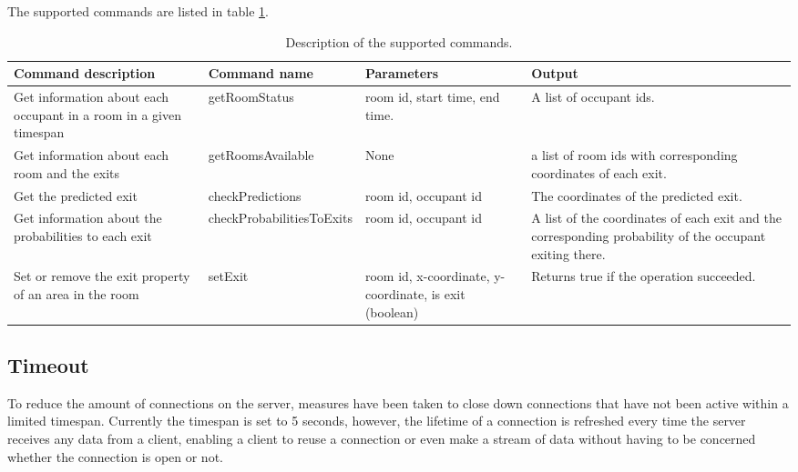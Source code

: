 The supported commands are listed in table \ref{tab:command}.
\begin{center}
\begin{table}
    \begin{tabular}{ | p{4.5cm} | p{4.7cm} | p{3cm} | p{3.5cm} |} \hline
    Command description & Command name & Parameters & Output \\ \hline
    Get information about each occupant in a room in a given timespan & getRoomStatus & room id, start time, end time. & A list of occupant ids. \\ \hline
    Get information about each room and the exits & getRoomsAvailable & None & a list of room ids with corresponding coordinates of each exit. \\ \hline
	Get the predicted exit & checkPredictions & room id, occupant id & The coordinates of the predicted exit. \\ \hline
	Get information about the probabilities to each exit & checkProbabilitiesToExits & room id, occupant id & A list of the coordinates of each exit and the corresponding probability of the occupant exiting there. \\ \hline
    Set  or remove the exit property of an area in the room & setExit & room id, x-coordinate, y-coordinate, is exit (boolean) & Returns true if the operation succeeded. \\ 
	\hline \end{tabular}
	\caption{Description of the supported commands.}
	\label{tab:command}
\end{table}
\end{center}

\subsection{Timeout}
To reduce the amount of connections on the server, measures have been taken to close down connections that have not been active within a limited timespan. Currently the timespan is set to 5 seconds, however, the lifetime of a connection is refreshed every time the server receives any data from a client, enabling a client to reuse a connection or even make a stream of data without having to be concerned whether the connection is open or not.
